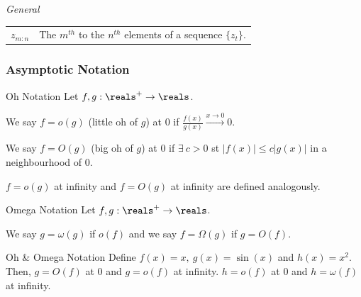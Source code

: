 \documentclass[11pt,a4paper]{article}
\begin{document}
  \textit{General}\\
  \begin{tabular}{|c|l|}
    \hline
    $z_{m:n}$&The $m^{th}$ to the $n^{th}$ elements of a sequence $\{z_t\}$.
    \hline
  \end{tabular}

\subsubsection{Asymptotic Notation}

  \begin{definition}{Oh Notation}
    Let $f,g:\reals^+\to\reals$.
    \par We say $f=o(g)$ (little oh of $g$) at 0 if $\frac{f(x)}{g(x)}\overset{x\to0}\longrightarrow0$.
    \par We say $f=O(g)$ (big oh of $g$) at 0 if $\exists\ c>0$ st $|f(x)|\leq c|g(x)|$ in a neighbourhood of 0.
    \par $f=o(g)$ at infinity and $f=O(g)$ at infinity are defined analogously.
  \end{definition}

  \begin{definition}{Omega Notation}
    Let $f,g:\reals^+\to\reals$.
    \par We say $g=\omega(g)$ if $o(f)$ and we say $f=\Omega(g)$ if $g=O(f)$.
  \end{definition}

  \begin{example}{Oh \& Omega Notation}
    Define $f(x)=x,\ g(x)=\sin(x)$ and $h(x)=x^2$.\\
    Then, $g=O(f)$ at 0 and $g=o(f)$ at infinity. $h=o(f)$ at 0 and $h=\omega(f)$ at infinity.
  \end{example}
\end{document}

